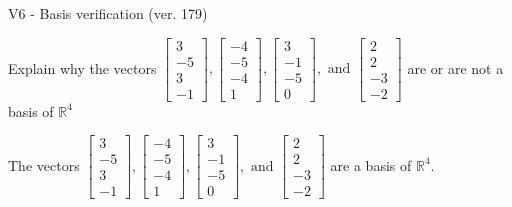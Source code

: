 \begin{exercise}
  \begin{exerciseTitle}V6 - Basis verification (ver. 179)\end{exerciseTitle}
  \begin{exerciseStatement}
    Explain why the vectors \(\left[\begin{array}{r}
3 \\
-5 \\
3 \\
-1
\end{array}\right] , \left[\begin{array}{r}
-4 \\
-5 \\
-4 \\
1
\end{array}\right] , \left[\begin{array}{r}
3 \\
-1 \\
-5 \\
0
\end{array}\right] , \text{ and } \left[\begin{array}{r}
2 \\
2 \\
-3 \\
-2
\end{array}\right]\) are or are not a basis of \(\mathbb{R}^4\)	


  \end{exerciseStatement}
  \begin{exerciseAnswer}
   The vectors \(\left[\begin{array}{r}
3 \\
-5 \\
3 \\
-1
\end{array}\right] , \left[\begin{array}{r}
-4 \\
-5 \\
-4 \\
1
\end{array}\right] , \left[\begin{array}{r}
3 \\
-1 \\
-5 \\
0
\end{array}\right] , \text{ and } \left[\begin{array}{r}
2 \\
2 \\
-3 \\
-2
\end{array}\right]\) 
  	 are  a basis of \(\mathbb{R}^4\).
  


  \end{exerciseAnswer}
\end{exercise}